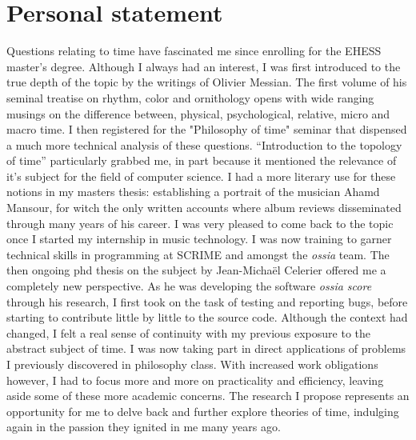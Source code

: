 \documentclass[journal,onecolumn]{IEEEtran}
\begin{document}
\section{Personal statement} %
Questions relating to time have fascinated me since enrolling for the EHESS master's degree. Although I always had an interest, I was first introduced to the true depth of the topic by the writings of Olivier Messian. The first volume of his seminal treatise on rhythm, color and ornithology\cite{messian:ornithology} opens with wide ranging musings on the difference between, physical, psychological, relative, micro and macro time. I then registered for the "Philosophy of time" seminar that  dispensed a much more technical analysis of these questions. ``Introduction to the topology of time''\cite{milliere:topologie} particularly grabbed me, in part because it mentioned the relevance of it's subject for the field of computer science. I had a more literary use for these notions in my masters thesis: establishing a portrait of the musician Ahamd Mansour, for witch the only written accounts where album reviews disseminated through many years of his career. I was very pleased to come back to the topic once I started my internship in music technology. I was now training to garner technical skills in programming at SCRIME and amongst the \textit{ossia} team. The then ongoing phd thesis on the subject by Jean-Michaël Celerier\cite{jcelerier:thesis} offered me a completely new perspective. As he was developing the software \textit{ossia score} through his research, I first took on the task of testing and reporting bugs, before starting to contribute little by little to the source code. Although the context had changed, I felt a real sense of continuity with my previous exposure to the abstract subject of time. I was now taking part in direct applications of problems I previously discovered in philosophy class. With increased work obligations however, I had to focus more and more on practicality and efficiency, leaving aside some of these more academic concerns. The research I propose represents an opportunity for me to delve back and further explore theories of time, indulging again in the passion they ignited in me many years ago. 
\end{document}
